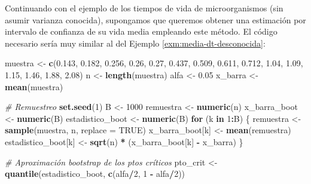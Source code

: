 \documentclass[]{book}
\newenvironment{Shaded}{\begin{snugshade}}{\end{snugshade}}
\newcommand{\KeywordTok}[1]{\textcolor[rgb]{0.13,0.29,0.53}{\textbf{#1}}}
\newcommand{\DataTypeTok}[1]{\textcolor[rgb]{0.13,0.29,0.53}{#1}}
\newcommand{\DecValTok}[1]{\textcolor[rgb]{0.00,0.00,0.81}{#1}}
\newcommand{\FloatTok}[1]{\textcolor[rgb]{0.00,0.00,0.81}{#1}}
\newcommand{\StringTok}[1]{\textcolor[rgb]{0.31,0.60,0.02}{#1}}
\newcommand{\CommentTok}[1]{\textcolor[rgb]{0.56,0.35,0.01}{\textit{#1}}}
\newcommand{\OtherTok}[1]{\textcolor[rgb]{0.56,0.35,0.01}{#1}}
\newcommand{\ControlFlowTok}[1]{\textcolor[rgb]{0.13,0.29,0.53}{\textbf{#1}}}
\newcommand{\OperatorTok}[1]{\textcolor[rgb]{0.81,0.36,0.00}{\textbf{#1}}}
\newcommand{\NormalTok}[1]{#1}
\theoremstyle{break}
\theoremstyle{definition}
\theoremstyle{definition}
\theoremstyle{definition}
\theoremstyle{remark}
\begin{document}
Continuando con el ejemplo de los tiempos de vida de microorganismos
(sin asumir varianza conocida), supongamos que queremos obtener una
estimación por intervalo de confianza de su vida media empleando este
método. El código necesario sería muy similar al del Ejemplo
\ref{exm:media-dt-desconocida}:

\begin{Shaded}
\begin{Highlighting}[]
\NormalTok{muestra <-}\StringTok{ }\KeywordTok{c}\NormalTok{(}\FloatTok{0.143}\NormalTok{, }\FloatTok{0.182}\NormalTok{, }\FloatTok{0.256}\NormalTok{, }\FloatTok{0.26}\NormalTok{, }\FloatTok{0.27}\NormalTok{, }\FloatTok{0.437}\NormalTok{, }\FloatTok{0.509}\NormalTok{, }
             \FloatTok{0.611}\NormalTok{, }\FloatTok{0.712}\NormalTok{, }\FloatTok{1.04}\NormalTok{, }\FloatTok{1.09}\NormalTok{, }\FloatTok{1.15}\NormalTok{, }\FloatTok{1.46}\NormalTok{, }\FloatTok{1.88}\NormalTok{, }\FloatTok{2.08}\NormalTok{)}
\NormalTok{n <-}\StringTok{ }\KeywordTok{length}\NormalTok{(muestra)}
\NormalTok{alfa <-}\StringTok{ }\FloatTok{0.05}
\NormalTok{x_barra <-}\StringTok{ }\KeywordTok{mean}\NormalTok{(muestra)}

\CommentTok{# Remuestreo}
\KeywordTok{set.seed}\NormalTok{(}\DecValTok{1}\NormalTok{)}
\NormalTok{B <-}\StringTok{ }\DecValTok{1000}
\NormalTok{remuestra <-}\StringTok{ }\KeywordTok{numeric}\NormalTok{(n)}
\NormalTok{x_barra_boot <-}\StringTok{ }\KeywordTok{numeric}\NormalTok{(B) }
\NormalTok{estadistico_boot <-}\StringTok{ }\KeywordTok{numeric}\NormalTok{(B)}
\ControlFlowTok{for}\NormalTok{ (k }\ControlFlowTok{in} \DecValTok{1}\OperatorTok{:}\NormalTok{B) \{}
\NormalTok{  remuestra <-}\StringTok{ }\KeywordTok{sample}\NormalTok{(muestra, n, }\DataTypeTok{replace =} \OtherTok{TRUE}\NormalTok{)}
\NormalTok{  x_barra_boot[k] <-}\StringTok{ }\KeywordTok{mean}\NormalTok{(remuestra)}
\NormalTok{  estadistico_boot[k] <-}\StringTok{ }\KeywordTok{sqrt}\NormalTok{(n) }\OperatorTok{*}\StringTok{ }\NormalTok{(x_barra_boot[k] }\OperatorTok{-}\StringTok{ }\NormalTok{x_barra)}
\NormalTok{\}}

\CommentTok{# Aproximación bootstrap de los ptos críticos}
\NormalTok{pto_crit <-}\StringTok{ }\KeywordTok{quantile}\NormalTok{(estadistico_boot, }\KeywordTok{c}\NormalTok{(alfa}\OperatorTok{/}\DecValTok{2}\NormalTok{, }\DecValTok{1} \OperatorTok{-}\StringTok{ }\NormalTok{alfa}\OperatorTok{/}\DecValTok{2}\NormalTok{))}


\end{Highlighting}
\end{Shaded}
\end{document}
